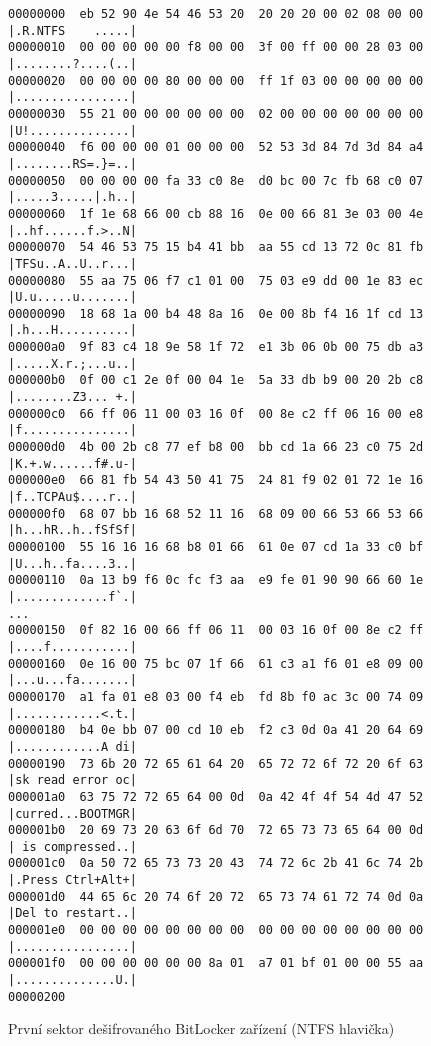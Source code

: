 \begin{figure}[h]
		\centering
		\captionsetup{width=0.65\linewidth}
\begin{lstlisting}[frame=none, basicstyle=\ttfamily\small, columns=fullflexible, keepspaces=true]
00000000  eb 52 90 4e 54 46 53 20  20 20 20 00 02 08 00 00  |.R.NTFS    .....|
00000010  00 00 00 00 00 f8 00 00  3f 00 ff 00 00 28 03 00  |........?....(..|
00000020  00 00 00 00 80 00 00 00  ff 1f 03 00 00 00 00 00  |................|
00000030  55 21 00 00 00 00 00 00  02 00 00 00 00 00 00 00  |U!..............|
00000040  f6 00 00 00 01 00 00 00  52 53 3d 84 7d 3d 84 a4  |........RS=.}=..|
00000050  00 00 00 00 fa 33 c0 8e  d0 bc 00 7c fb 68 c0 07  |.....3.....|.h..|
00000060  1f 1e 68 66 00 cb 88 16  0e 00 66 81 3e 03 00 4e  |..hf......f.>..N|
00000070  54 46 53 75 15 b4 41 bb  aa 55 cd 13 72 0c 81 fb  |TFSu..A..U..r...|
00000080  55 aa 75 06 f7 c1 01 00  75 03 e9 dd 00 1e 83 ec  |U.u.....u.......|
00000090  18 68 1a 00 b4 48 8a 16  0e 00 8b f4 16 1f cd 13  |.h...H..........|
000000a0  9f 83 c4 18 9e 58 1f 72  e1 3b 06 0b 00 75 db a3  |.....X.r.;...u..|
000000b0  0f 00 c1 2e 0f 00 04 1e  5a 33 db b9 00 20 2b c8  |........Z3... +.|
000000c0  66 ff 06 11 00 03 16 0f  00 8e c2 ff 06 16 00 e8  |f...............|
000000d0  4b 00 2b c8 77 ef b8 00  bb cd 1a 66 23 c0 75 2d  |K.+.w......f#.u-|
000000e0  66 81 fb 54 43 50 41 75  24 81 f9 02 01 72 1e 16  |f..TCPAu$....r..|
000000f0  68 07 bb 16 68 52 11 16  68 09 00 66 53 66 53 66  |h...hR..h..fSfSf|
00000100  55 16 16 16 68 b8 01 66  61 0e 07 cd 1a 33 c0 bf  |U...h..fa....3..|
00000110  0a 13 b9 f6 0c fc f3 aa  e9 fe 01 90 90 66 60 1e  |.............f`.|
...
00000150  0f 82 16 00 66 ff 06 11  00 03 16 0f 00 8e c2 ff  |....f...........|
00000160  0e 16 00 75 bc 07 1f 66  61 c3 a1 f6 01 e8 09 00  |...u...fa.......|
00000170  a1 fa 01 e8 03 00 f4 eb  fd 8b f0 ac 3c 00 74 09  |............<.t.|
00000180  b4 0e bb 07 00 cd 10 eb  f2 c3 0d 0a 41 20 64 69  |............A di|
00000190  73 6b 20 72 65 61 64 20  65 72 72 6f 72 20 6f 63  |sk read error oc|
000001a0  63 75 72 72 65 64 00 0d  0a 42 4f 4f 54 4d 47 52  |curred...BOOTMGR|
000001b0  20 69 73 20 63 6f 6d 70  72 65 73 73 65 64 00 0d  | is compressed..|
000001c0  0a 50 72 65 73 73 20 43  74 72 6c 2b 41 6c 74 2b  |.Press Ctrl+Alt+|
000001d0  44 65 6c 20 74 6f 20 72  65 73 74 61 72 74 0d 0a  |Del to restart..|
000001e0  00 00 00 00 00 00 00 00  00 00 00 00 00 00 00 00  |................|
000001f0  00 00 00 00 00 00 8a 01  a7 01 bf 01 00 00 55 aa  |..............U.|
00000200
\end{lstlisting}
		\caption{První sektor dešifrovaného BitLocker zařízení (NTFS hlavička)}
		\label{fig:ntfs-header}
\end{figure}

